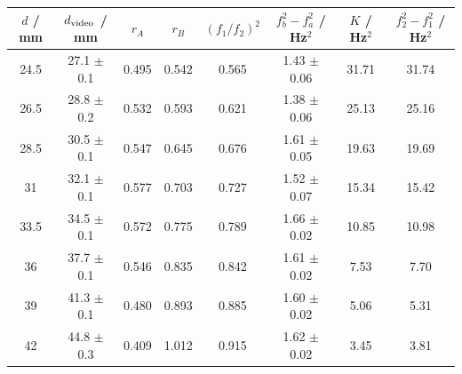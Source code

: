 \begin{tabular}{@{}cccccccc@{}}
\toprule
$d$ / mm & $d_{\rm video}$ / mm & $r_A$ & $r_B$ & $(f_1/f_2)^2$ & $f_b^2-f_a^2$ / Hz$^2$ & $K$ / Hz$^2$ & $f_2^2-f_1^2$ / Hz$^2$ \\
\midrule
24.5 & 27.1 $\pm$ 0.1 & 0.495 & 0.542 & 0.565 & 1.43 $\pm$ 0.06 & 31.71 & 31.74 \\
26.5 & 28.8 $\pm$ 0.2 & 0.532 & 0.593 & 0.621 & 1.38 $\pm$ 0.06 & 25.13 & 25.16 \\
28.5 & 30.5 $\pm$ 0.1 & 0.547 & 0.645 & 0.676 & 1.61 $\pm$ 0.05 & 19.63 & 19.69 \\
31 & 32.1 $\pm$ 0.1 & 0.577 & 0.703 & 0.727 & 1.52 $\pm$ 0.07 & 15.34 & 15.42 \\
33.5 & 34.5 $\pm$ 0.1 & 0.572 & 0.775 & 0.789 & 1.66 $\pm$ 0.02 & 10.85 & 10.98 \\
36 & 37.7 $\pm$ 0.1 & 0.546 & 0.835 & 0.842 & 1.61 $\pm$ 0.02 & 7.53 & 7.70 \\
39 & 41.3 $\pm$ 0.1 & 0.480 & 0.893 & 0.885 & 1.60 $\pm$ 0.02 & 5.06 & 5.31 \\
42 & 44.8 $\pm$ 0.3 & 0.409 & 1.012 & 0.915 & 1.62 $\pm$ 0.02 & 3.45 & 3.81 \\
\bottomrule
\end{tabular}